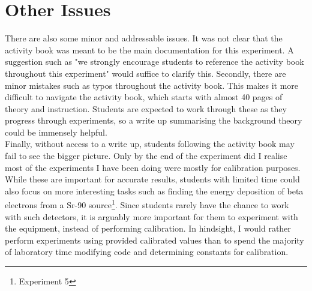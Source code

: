 \documentclass[12pt]{article}
\begin{document}
\section{Other Issues}

There are also some minor and addressable issues. It was not clear that the activity book was meant to be the main documentation for this experiment. A suggestion such as "we strongly encourage students to reference the activity book throughout this experiment" would suffice to clarify this. Secondly, there are minor mistakes such as typos throughout the activity book. This makes it more difficult to navigate the activity book, which starts with almost 40 pages of theory and instruction. Students are expected to work through these as they progress through experiments, so a write up summarising the background theory could be immensely helpful. \\

Finally, without access to a write up, students following the activity book may fail to see the bigger picture. Only by the end of the experiment did I realise most of the experiments I have been doing were mostly for calibration purposes. While these are important for accurate results, students with limited time could also focus on more interesting tasks such as finding the energy deposition of beta electrons from a Sr-90 source\footnote{Experiment 5}. Since students rarely have the chance to work with such detectors, it is arguably more important for them to experiment with the equipment, instead of performing calibration. In hindsight, I would rather perform experiments using provided calibrated values than to spend the majority of laboratory time modifying code and determining constants for calibration.



{}

\end{document}
